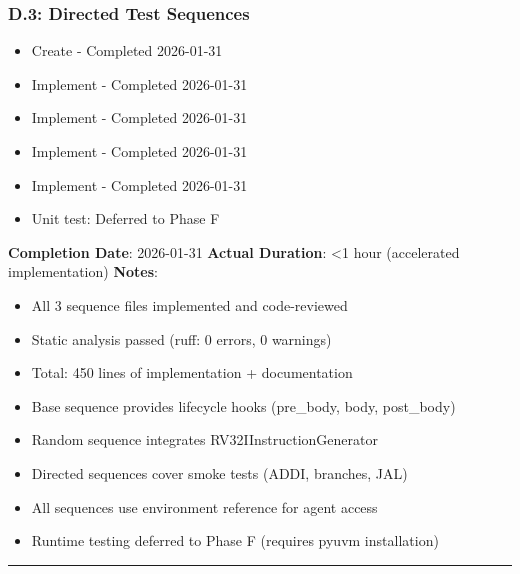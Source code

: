 \subsubsection{D.3: Directed Test Sequences}\label{cr:status:pyuvm-migration:d3-directed-test-sequences}

\begin{record}

\begin{itemize}
\tightlist
\item[$\boxtimes$]
  Create  - Completed
  2026-01-31
\item[$\boxtimes$]
  Implement  - Completed 2026-01-31
\item[$\boxtimes$]
  Implement  - Completed 2026-01-31
\item[$\boxtimes$]
  Implement  - Completed 2026-01-31
\item[$\boxtimes$]
  Implement  - Completed 2026-01-31
\item[$\boxtimes$]
  Unit test: Deferred to Phase F
\end{itemize}

\textbf{Completion Date}: 2026-01-31 \textbf{Actual Duration}:
\textless1 hour (accelerated implementation) \textbf{Notes}:

\begin{itemize}
\tightlist
\item
  All 3 sequence files implemented and code-reviewed
\item
  Static analysis passed (ruff: 0 errors, 0 warnings)
\item
  Total: 450 lines of implementation + documentation
\item
  Base sequence provides lifecycle hooks (pre\_\allowbreak{}body, body,
  post\_\allowbreak{}body)
\item
  Random sequence integrates RV32IInstructionGenerator
\item
  Directed sequences cover smoke tests (ADDI, branches, JAL)
\item
  All sequences use environment reference for agent access
\item
  Runtime testing deferred to Phase F (requires pyuvm installation)
\end{itemize}

\begin{center}\rule{0.5\linewidth}{0.5pt}\end{center}

\end{record}

